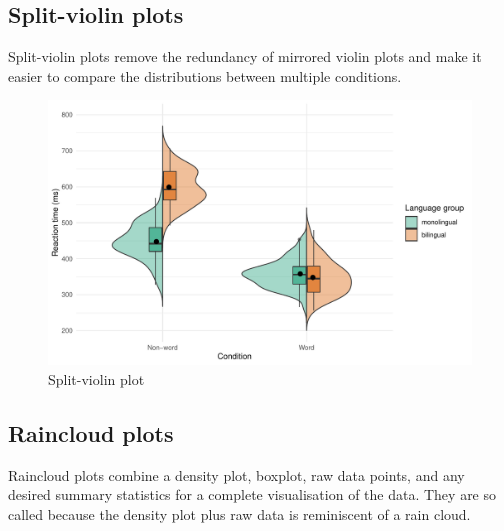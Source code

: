 \documentclass[
  english,
  doc,floatsintext]{apa6}
\begin{document}
\hypertarget{split-violin-plots}{%
\subsection{Split-violin plots}\label{split-violin-plots}}

Split-violin plots remove the redundancy of mirrored violin plots and make it easier to compare the distributions between multiple conditions.

\begin{figure}

{\centering \includegraphics[width=1\linewidth]{images/splitviolin-1} 

}

\caption{Split-violin plot}\label{fig:splitviolin}
\end{figure}

\hypertarget{raincloud-plots}{%
\subsection{Raincloud plots}\label{raincloud-plots}}

Raincloud plots combine a density plot, boxplot, raw data points, and any desired summary statistics for a complete visualisation of the data. They are so called because the density plot plus raw data is reminiscent of a rain cloud.
\end{document}
